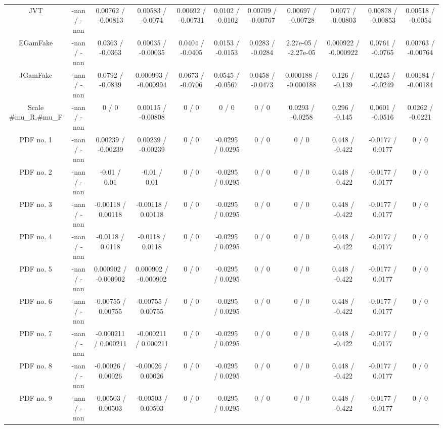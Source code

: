 \begin{table}[htbp]
\begin{center}
\begin{tabular}{|c|c|c|c|c|c|c|c|c|c|c|}
  JVT & -nan / -nan & 0.00762 / -0.00813 & 0.00583 / -0.0074 & 0.00692 / -0.00731 & 0.0102 / -0.0102 & 0.00709 / -0.00767 & 0.00697 / -0.00728 & 0.0077 / -0.00803 & 0.00878 / -0.00853 & 0.00518 / -0.0054 \\ 
  EGamFake & -nan / -nan & 0.0363 / -0.0363 & 0.00035 / -0.00035 & 0.0404 / -0.0405 & 0.0153 / -0.0153 & 0.0283 / -0.0284 & 2.27e-05 / -2.27e-05 & 0.000922 / -0.000922 & 0.0761 / -0.0765 & 0.00763 / -0.00764 \\ 
  JGamFake & -nan / -nan & 0.0792 / -0.0839 & 0.000993 / -0.000994 & 0.0673 / -0.0706 & 0.0545 / -0.0567 & 0.0458 / -0.0473 & 0.000188 / -0.000188 & 0.126 / -0.139 & 0.0245 / -0.0249 & 0.00184 / -0.00184 \\ 
  Scale #mu_{R},#mu_{F} & -nan / -nan & 0 / 0 & 0.00115 / -0.00808 & 0 / 0 & 0 / 0 & 0 / 0 & 0.0293 / -0.0258 & 0.296 / -0.145 & 0.0601 / -0.0516 & 0.0262 / -0.0221 \\ 
  PDF no. 1 & -nan / -nan & 0.00239 / -0.00239 & 0.00239 / -0.00239 & 0 / 0 & -0.0295 / 0.0295 & 0 / 0 & 0 / 0 & 0.448 / -0.422 & -0.0177 / 0.0177 & 0 / 0 \\ 
  PDF no. 2 & -nan / -nan & -0.01 / 0.01 & -0.01 / 0.01 & 0 / 0 & -0.0295 / 0.0295 & 0 / 0 & 0 / 0 & 0.448 / -0.422 & -0.0177 / 0.0177 & 0 / 0 \\ 
  PDF no. 3 & -nan / -nan & -0.00118 / 0.00118 & -0.00118 / 0.00118 & 0 / 0 & -0.0295 / 0.0295 & 0 / 0 & 0 / 0 & 0.448 / -0.422 & -0.0177 / 0.0177 & 0 / 0 \\ 
  PDF no. 4 & -nan / -nan & -0.0118 / 0.0118 & -0.0118 / 0.0118 & 0 / 0 & -0.0295 / 0.0295 & 0 / 0 & 0 / 0 & 0.448 / -0.422 & -0.0177 / 0.0177 & 0 / 0 \\ 
  PDF no. 5 & -nan / -nan & 0.000902 / -0.000902 & 0.000902 / -0.000902 & 0 / 0 & -0.0295 / 0.0295 & 0 / 0 & 0 / 0 & 0.448 / -0.422 & -0.0177 / 0.0177 & 0 / 0 \\ 
  PDF no. 6 & -nan / -nan & -0.00755 / 0.00755 & -0.00755 / 0.00755 & 0 / 0 & -0.0295 / 0.0295 & 0 / 0 & 0 / 0 & 0.448 / -0.422 & -0.0177 / 0.0177 & 0 / 0 \\ 
  PDF no. 7 & -nan / -nan & -0.000211 / 0.000211 & -0.000211 / 0.000211 & 0 / 0 & -0.0295 / 0.0295 & 0 / 0 & 0 / 0 & 0.448 / -0.422 & -0.0177 / 0.0177 & 0 / 0 \\ 
  PDF no. 8 & -nan / -nan & -0.00026 / 0.00026 & -0.00026 / 0.00026 & 0 / 0 & -0.0295 / 0.0295 & 0 / 0 & 0 / 0 & 0.448 / -0.422 & -0.0177 / 0.0177 & 0 / 0 \\ 
  PDF no. 9 & -nan / -nan & -0.00503 / 0.00503 & -0.00503 / 0.00503 & 0 / 0 & -0.0295 / 0.0295 & 0 / 0 & 0 / 0 & 0.448 / -0.422 & -0.0177 / 0.0177 & 0 / 0 \\ 

\end{tabular}
\end{center}
\end{table}
